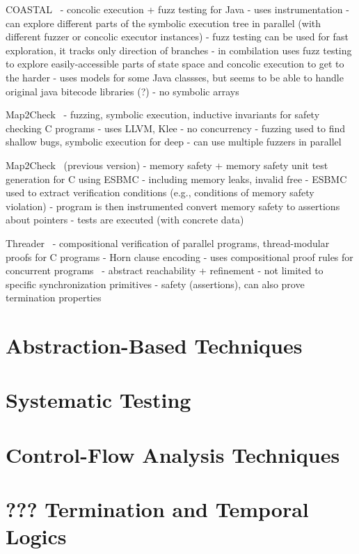 COASTAL~\cite{Visser2020}
- concolic execution + fuzz testing for Java
- uses instrumentation
- can explore different parts of the symbolic execution tree in parallel (with different fuzzer or concolic executor instances)
- fuzz testing can be used for fast exploration, it tracks only direction of branches
- in combilation uses fuzz testing to explore easily-accessible parts of state space and concolic execution to get to the harder
- uses models for some Java classses, but seems to be able to handle original java bitecode libraries (?)
- no symbolic arrays

Map2Check~\cite{Rocha2020}
- fuzzing, symbolic execution, inductive invariants for safety checking C programs
- uses LLVM, Klee
- no concurrency
- fuzzing used to find shallow bugs, symbolic execution for deep
- can use multiple fuzzers in parallel

Map2Check~\cite{Rocha2015} (previous version)
- memory safety + memory safety unit test generation for C using ESBMC
  - including memory leaks, invalid free
- ESBMC used to extract verification conditions (e.g., conditions of memory safety violation)
- program is then instrumented convert memory safety to assertions about pointers
- tests are executed (with concrete data)

Threader~\cite{Gupta2011}
- compositional verification of parallel programs, thread-modular proofs for C programs
- Horn clause encoding
- uses compositional proof rules for concurrent programs~\cite{Jones1983,Owicki1976}
- abstract reachability + refinement
- not limited to specific synchronization primitives
- safety (assertions), can also prove termination properties

\section{Abstraction-Based Techniques}

\section{Systematic Testing}

\section{Control-Flow Analysis Techniques}

\section{??? Termination and Temporal Logics}

